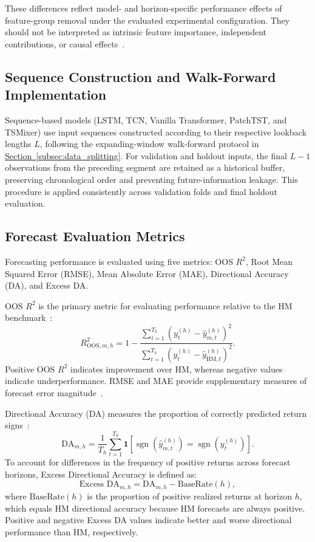 \documentclass[runningheads,orivec]{llncs}
\begin{document}
These differences reflect model- and horizon-specific performance effects of feature-group removal under the evaluated experimental configuration. They should not be interpreted as intrinsic feature importance, independent contributions, or causal effects~\cite{hooker2021}.

\subsection{Sequence Construction and Walk-Forward Implementation}\label{subsec:walk_forward}

Sequence-based models (LSTM, TCN, Vanilla Transformer, PatchTST, and TSMixer) use input sequences constructed according to their respective lookback lengths $L$, following the expanding-window walk-forward protocol in \hyperref[subsec:data_splitting]{Section~\ref*{subsec:data_splitting}}. For validation and holdout inputs, the final $L-1$ observations from the preceding segment are retained as a historical buffer, preserving chronological order and preventing future-information leakage. This procedure is applied consistently across validation folds and final holdout evaluation.

\subsection{Forecast Evaluation Metrics}\label{subsec:eval_metrics}

Forecasting performance is evaluated using five metrics: OOS $R^2$, Root Mean Squared Error (RMSE), Mean Absolute Error (MAE), Directional Accuracy (DA), and Excess DA.

OOS $R^2$ is the primary metric for evaluating performance relative to the HM benchmark~\cite{campbell2008}:
\begin{equation}\label{eq:oos_r2}
R^2_{\mathrm{OOS},m,h} = 1 - \frac{\sum_{t=1}^{T_h} (y_t^{(h)} - \hat{y}_{m,t}^{(h)})^2}{\sum_{t=1}^{T_h} (y_t^{(h)} - \hat{y}_{\mathrm{HM},t}^{(h)})^2}.
\end{equation}
Positive OOS $R^2$ indicates improvement over HM, whereas negative values indicate underperformance. RMSE and MAE provide supplementary measures of forecast error magnitude~\cite{hodson2022}.

Directional Accuracy (DA) measures the proportion of correctly predicted return signs~\cite{pesaran1992}:
\begin{equation}\label{eq:da}
\text{DA}_{m,h} = \frac{1}{T_h}\sum_{t=1}^{T_h} \mathbf{1}\left[\operatorname{sgn}(\hat{y}_{m,t}^{(h)}) = \operatorname{sgn}(y_t^{(h)})\right].
\end{equation}
To account for differences in the frequency of positive returns across forecast horizons, Excess Directional Accuracy is defined as:
\begin{equation}\label{eq:excess_da}
\text{Excess DA}_{m,h} = \text{DA}_{m,h} - \text{BaseRate}(h),
\end{equation}
where $\text{BaseRate}(h)$ is the proportion of positive realized returns at horizon $h$, which equals HM directional accuracy because HM forecasts are always positive. Positive and negative Excess DA values indicate better and worse directional performance than HM, respectively.
\end{document}
